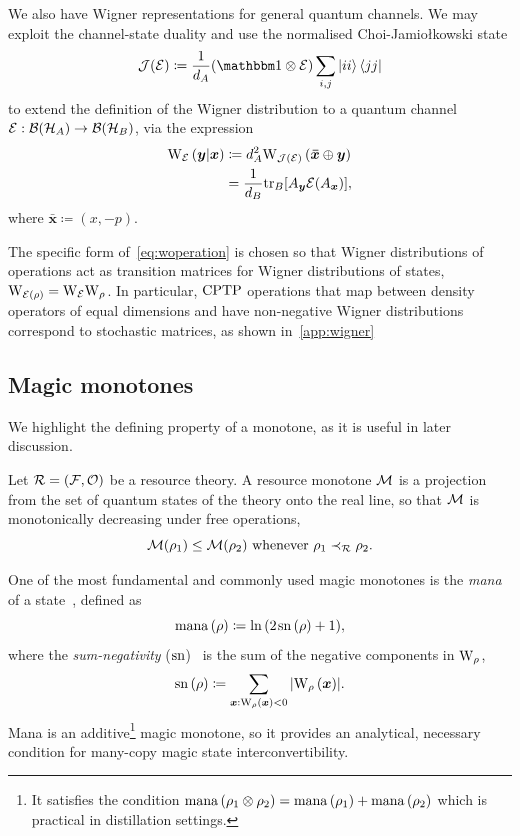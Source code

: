 \documentclass[pra,
aps,
twocolumn,
superscriptaddress,
groupedaddress,
nofootinbib,
reprint
]{revtex4-1}
\begin{document}
We also have Wigner representations for general quantum channels. We may exploit the channel-state duality and use the normalised Choi-Jamio\l{}kowski state 
\begin{equation}\label{eq:cj}
  \J(\E) \coloneqq \frac{1}{d_A}(\id \otimes \E) \sum_{i,j} \ket{ii}\bra{jj}
\end{equation}
to extend the definition of the Wigner distribution to a quantum channel $\mathcal{E}: {\mathcal B}({\mathcal H}_A) \rightarrow {\mathcal B}({\mathcal H}_B)$, via the expression
\begin{align}\label{eq:woperation}
    \W[\bmy|\bmx]{\E} 
    &\coloneqq d_A^2 \W[\bm{\bar x} \oplus \bmy]{\J(\E)} \\
    &= \frac{1}{d_B} \tr_B[A_{\bmy} \E(A_{\bmx})],
\end{align}
where $\bm{\bar x} \coloneqq (x, -p)$.

The specific form of~\cref{eq:woperation} is chosen so that Wigner distributions of operations act as transition matrices for Wigner distributions of states, $\W{\E(\rho)} = \W{\E}\W{\rho}$.
In particular, ${\rm{CPTP}}$ operations that map between density operators of equal dimensions and have non-negative Wigner distributions correspond to stochastic matrices, as shown in~\cref{app:wigner}

\subsection{Magic monotones}
\label{sec:mono}

We highlight the defining property of a monotone, as it is useful in later discussion.
\begin{definition}\label{def:mono}
    Let $\mathcal{R} = (\mathcal{F}, \mathcal{O})$ be a resource theory.
    A resource monotone $\mathcal{M}$ is a projection from the set of quantum states of the theory onto the real line, so that $\mathcal{M}$ is monotonically decreasing under free operations,
    \begin{equation}
        \mathcal{M}(\rho_1) \leq \mathcal{M}(\rho_2)\ \text{whenever}\ \rho_1 \prec_{\mathcal{R}} \rho_2.
    \end{equation}
\end{definition}

One of the most fundamental and commonly used magic monotones is the \emph{mana} of a state~\cite{cit:veitch2}, defined as
\begin{equation}
    {{\rm{mana}}\left(\rho\right)} \coloneqq \ln{(2\hspace{1pt} {{\rm{sn}}\left(\rho\right)} +1)},
\end{equation}
where the \emph{sum-negativity} ($\rm{sn}$)~\cite{cit:veitch2} is the sum of the negative components in $\W{\rho}$,
\begin{equation}
    \sn{\rho} \coloneqq \sum\limits_{\bmx: \W[\bmx]{\rho} < 0} \abs{\W[\bmx]{\rho}}.
\end{equation}
Mana is an additive\footnote{It satisfies the condition ${{\rm{mana}}\left(\rho_1 \otimes \rho_2\right)} = {{\rm{mana}}\left(\rho_1\right)} + {{\rm{mana}}\left(\rho_2\right)}$ which is practical in distillation settings.} magic monotone, so it provides an analytical, necessary condition for many-copy magic state interconvertibility.
\end{document}
